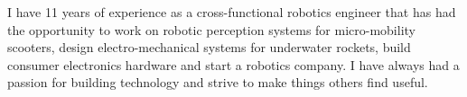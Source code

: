 

\begin{cvparagraph}

I have 11 years of experience as a cross-functional robotics engineer that has
had the opportunity to work on robotic perception systems for micro-mobility
scooters, design electro-mechanical systems for underwater rockets, build
consumer electronics hardware and start a robotics company. I have always had a
passion for building technology and strive to make things others find useful.
\end{cvparagraph}
